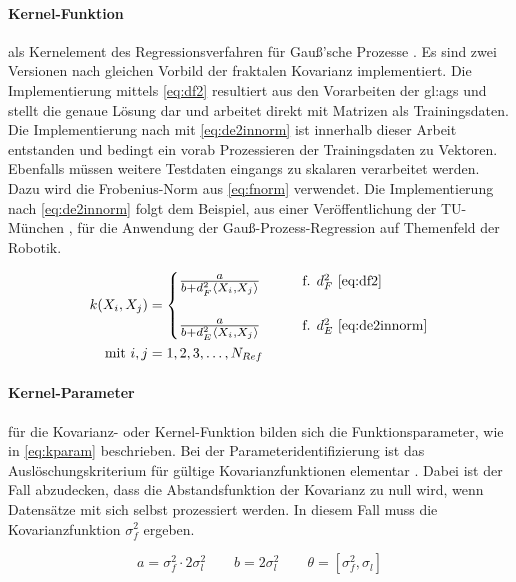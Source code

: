 \paragraph*{Kernel-Funktion} als Kernelement des Regressionsverfahren für Gauß'sche Prozesse \cite{Rasmussen2006}. Es sind zwei Versionen nach gleichen Vorbild der fraktalen Kovarianz \cite{Schuethe2020b}\cite{Schuethe2020}  implementiert. Die Implementierung mittels \autoref{eq:df2} resultiert aus den Vorarbeiten der \gls{gl:ags} und stellt die genaue Lösung dar und arbeitet direkt mit Matrizen als Trainingsdaten. Die Implementierung nach mit \autoref{eq:de2innorm} ist innerhalb dieser Arbeit entstanden und bedingt ein vorab Prozessieren der Trainingsdaten zu Vektoren. Ebenfalls müssen weitere Testdaten eingangs zu skalaren verarbeitet werden. Dazu wird die Frobenius-Norm aus \autoref{eq:fnorm} verwendet. Die Implementierung nach \autoref{eq:de2innorm} folgt dem Beispiel, aus einer Veröffentlichung der TU-München \cite{Lang2014}, für die Anwendung der Gauß-Prozess-Regression auf Themenfeld der Robotik.


\begin{align}\label{eq:kfun}
	k(X_i, X_j) &= 
		\begin{cases}
			\resizebox{.17\linewidth}{!}{$\frac{a}{b + d_F^2\langle X_i, X_j \rangle}$} &\qquad \text{f. } d_F^2 \text{ \eqref{eq:df2}} \\\\
			\resizebox{.17\linewidth}{!}{$\frac{a}{b + d_E^2\langle X_i, X_j \rangle}$} &\qquad \text{f. } d_E^2 \text{ \eqref{eq:de2innorm}}
		\end{cases} \\
\text{mit } i,j &= 1,2,3,\ldots,N_{Ref} \nonumber
\end{align}


\clearpage


\paragraph*{Kernel-Parameter} für die Kovarianz- oder Kernel-Funktion bilden sich die Funktionsparameter, wie in \autoref{eq:kparam} beschrieben. Bei der Parameteridentifizierung ist das Auslöschungskriterium für gültige Kovarianzfunktionen elementar \cite{Rasmussen2006}. Dabei ist der Fall abzudecken, dass die Abstandsfunktion der Kovarianz zu null wird, wenn Datensätze mit sich selbst prozessiert werden. In diesem Fall muss die Kovarianzfunktion $\sigma_f^2$ ergeben.


\begin{equation}\label{eq:kparam}
	a = \sigma_f^2 \cdot 2 \sigma_l^2 \qquad b = 2 \sigma_l^2 \qquad \theta = \left[\sigma_f^2, \sigma_l\right]
\end{equation}


